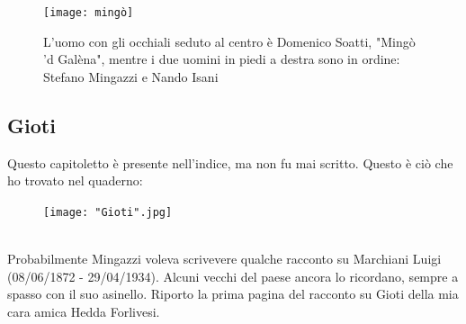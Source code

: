  \begin{figure}[htb]
    \centering
    \texttt{[image: mingò]}
    \caption*{L'uomo con gli occhiali seduto al centro è Domenico Soatti, "Mingò 'd Galèna", mentre i due uomini in piedi a destra sono in ordine: Stefano Mingazzi e Nando Isani\label{fig:mingò}}
\end{figure}

\newpage
\subsection{Gioti}
Questo capitoletto è presente nell'indice, ma non fu mai scritto. Questo è ciò che ho trovato nel quaderno:\\
\begin{figure}[!htbp]
   \texttt{[image: "Gioti".jpg]}
\end{figure}
\\Probabilmente Mingazzi voleva scrivevere qualche racconto su Marchiani Luigi (08/06/1872 - 29/04/1934). Alcuni vecchi del paese ancora lo ricordano, sempre a spasso con il suo asinello.
\newpage
Riporto la prima pagina del racconto su Gioti della mia cara amica Hedda Forlivesi.\\


